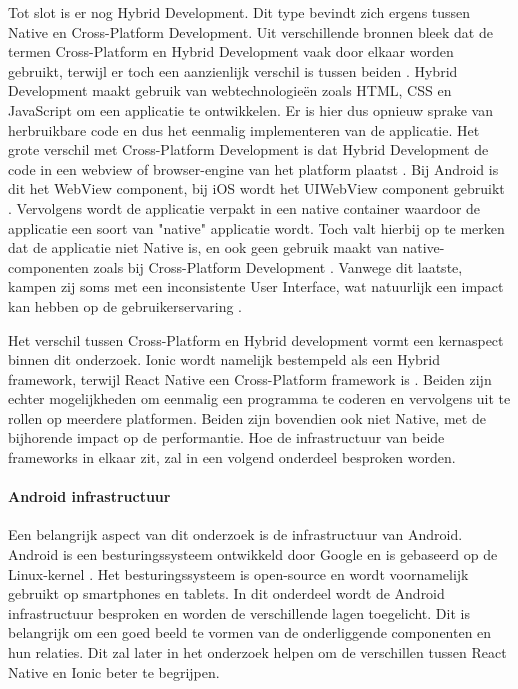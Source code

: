 Tot slot is er nog Hybrid Development. Dit type bevindt zich ergens tussen Native en Cross-Platform Development. Uit verschillende bronnen bleek dat de termen Cross-Platform en Hybrid Development vaak door elkaar worden gebruikt, terwijl er toch een aanzienlijk verschil is tussen beiden \autocite{Bron1, Bron11, Bron12}. Hybrid Development maakt gebruik van webtechnologieën zoals HTML, CSS en JavaScript om een applicatie te ontwikkelen. Er is hier dus opnieuw sprake van herbruikbare code en dus het eenmalig implementeren van de applicatie. Het grote verschil met Cross-Platform Development is dat Hybrid Development de code in een webview of browser-engine van het platform plaatst \autocite{Bron11, Bron1}. Bij Android is dit het WebView component, bij iOS wordt het UIWebView component gebruikt \autocite{Bron4}. Vervolgens wordt de applicatie verpakt in een native container waardoor de applicatie een soort van "native" applicatie wordt. Toch valt hierbij op te merken dat de applicatie niet Native is, en ook geen gebruik maakt van native-componenten zoals bij Cross-Platform Development \autocite{Bron12, Bron6}. Vanwege dit laatste, kampen zij soms met een inconsistente User Interface, wat natuurlijk een impact kan hebben op de gebruikerservaring \autocite{Bron12}.

Het verschil tussen Cross-Platform en Hybrid development vormt een kernaspect binnen dit onderzoek. Ionic wordt namelijk bestempeld als een Hybrid framework, terwijl React Native een Cross-Platform framework is \autocite{Bron4, Bron1}. Beiden zijn echter mogelijkheden om eenmalig een programma te coderen en vervolgens uit te rollen op meerdere platformen. Beiden zijn bovendien ook niet Native, met de bijhorende impact op de performantie. Hoe de infrastructuur van beide frameworks in elkaar zit, zal in een volgend onderdeel besproken worden.


\paragraph{Android infrastructuur}

Een belangrijk aspect van dit onderzoek is de infrastructuur van Android. Android is een besturingssysteem ontwikkeld door Google en is gebaseerd op de Linux-kernel \autocite{Bron13}. Het besturingssysteem is open-source en wordt voornamelijk gebruikt op smartphones en tablets. In dit onderdeel wordt de Android infrastructuur besproken en worden de verschillende lagen toegelicht. Dit is belangrijk om een goed beeld te vormen van de onderliggende componenten en hun relaties. Dit zal later in het onderzoek helpen om de verschillen tussen React Native en Ionic beter te begrijpen.

